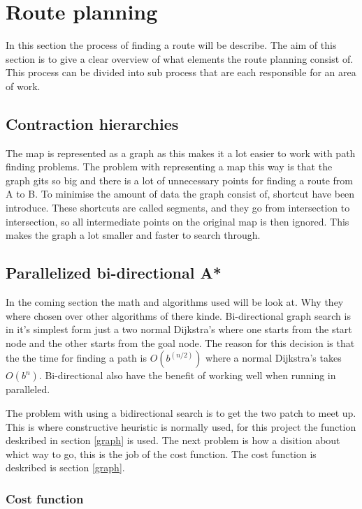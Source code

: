 \section{Route planning}
In this section the process of finding a route will be describe.
The aim of this section is to give a clear overview of what elements the route planning consist of.
This process can be divided into sub process that are each responsible for an area of work.

\subsection{Contraction hierarchies}\label{contraction-hierarchies}
The map is represented as a graph as this makes it a lot easier to work with path finding problems. The problem with representing a map this way is that the graph gits so big and there is a lot of unnecessary points for finding a route from A to B. To minimise the amount of data the graph consist of, shortcut have been introduce. These shortcuts are called segments, and they go from intersection to intersection, so all intermediate points on the original map is then ignored. This makes the graph a lot smaller and faster to search through.

\subsection{Parallelized bi-directional A*} \label{algorithms}

In the coming section the math and algorithms used will be look at. Why they where chosen over other algorithms of there kinde.
Bi-directional graph search is in it's simplest form just a two normal Dijkstra’s where one starts from the start node and the other starts from the goal node.
The reason for this decision is that the the time for finding a path is $O(b^{(n/2)})$ where a normal Dijkstra’s takes $O(b^{n})$. Bi-directional also have the benefit of working well when running in paralleled.


The problem with using a bidirectional search is to get the two patch to meet up. This is where constructive heuristic is normally used, for this project the function deskribed in section \ref{graph} is used. The next problem is how a disition about whict way to go, this is the job of the cost function. The cost function is deskribed is section \ref{graph}.


\subsubsection{Cost function}
